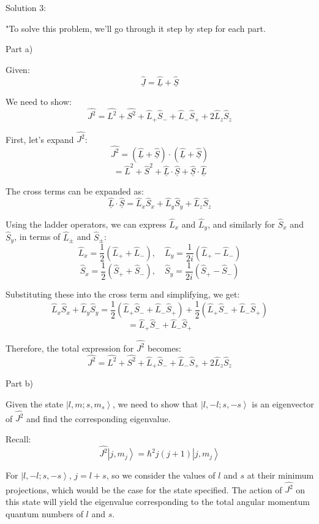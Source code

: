 Solution 3:

"To solve this problem, we'll go through it step by step for each part.

Part a)

Given:
\[ \hat{\underline{J}} = \hat{\underline{L}} + \hat{\underline{S}} \]

We need to show:
\[ \hat{J^{2}} = \hat{L^{2}} + \hat{S^{2}} + \hat{L}_{+}\hat{S}_{-} + \hat{L}_{-}\hat{S}_{+} + 2\hat{L}_{z}\hat{S}_{z} \]

First, let's expand \(\hat{J^{2}}\):
\[ \hat{J^{2}} = (\hat{\underline{L}} + \hat{\underline{S}}) \cdot (\hat{\underline{L}} + \hat{\underline{S}}) \]
\[ = \hat{L}^2 + \hat{S}^2 + \hat{\underline{L}}\cdot\hat{\underline{S}} + \hat{\underline{S}}\cdot\hat{\underline{L}} \]

The cross terms can be expanded as:
\[ \hat{\underline{L}}\cdot\hat{\underline{S}} = \hat{L}_{x}\hat{S}_{x} + \hat{L}_{y}\hat{S}_{y} + \hat{L}_{z}\hat{S}_{z} \]

Using the ladder operators, we can express \(\hat{L}_{x}\) and \(\hat{L}_{y}\), and similarly for \(\hat{S}_{x}\) and \(\hat{S}_{y}\), in terms of \(\hat{L}_{\pm}\) and \(\hat{S}_{\pm}\):
\[ \hat{L}_{x} = \frac{1}{2}(\hat{L}_{+} + \hat{L}_{-}), \quad \hat{L}_{y} = \frac{1}{2i}(\hat{L}_{+} - \hat{L}_{-}) \]
\[ \hat{S}_{x} = \frac{1}{2}(\hat{S}_{+} + \hat{S}_{-}), \quad \hat{S}_{y} = \frac{1}{2i}(\hat{S}_{+} - \hat{S}_{-}) \]

Substituting these into the cross term and simplifying, we get:
\[ \hat{L}_{x}\hat{S}_{x} + \hat{L}_{y}\hat{S}_{y} = \frac{1}{2}(\hat{L}_{+}\hat{S}_{-} + \hat{L}_{-}\hat{S}_{+}) + \frac{1}{2}(\hat{L}_{+}\hat{S}_{-} + \hat{L}_{-}\hat{S}_{+}) \]
\[ = \hat{L}_{+}\hat{S}_{-} + \hat{L}_{-}\hat{S}_{+} \]

Therefore, the total expression for \(\hat{J^{2}}\) becomes:
\[ \hat{J^{2}} = \hat{L^{2}} + \hat{S^{2}} + \hat{L}_{+}\hat{S}_{-} + \hat{L}_{-}\hat{S}_{+} + 2\hat{L}_{z}\hat{S}_{z} \]

Part b)

Given the state \(\left|l, m; s, m_{s} \right>\), we need to show that \(\left|l, -l; s, -s \right>\) is an eigenvector of \(\hat{J^{2}}\) and find the corresponding eigenvalue.

Recall:
\[ \hat{J^{2}}\left|j, m_j\right> = \hbar^2 j(j+1)\left|j, m_j\right> \]

For \(\left|l, -l; s, -s \right>\), \(j = l + s\), so we consider the values of \(l\) and \(s\) at their minimum projections, which would be the case for the state specified. The action of \(\hat{J^2}\) on this state will yield the eigenvalue corresponding to the total angular momentum quantum numbers of \(l\) and \(s\).

